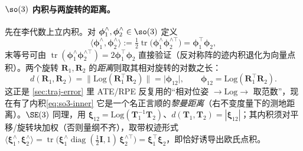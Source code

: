 \paragraph{$\so(3)$ 内积与两旋转的距离。}先在李代数上立内积。对 $\boldsymbol{\phi}_1^\wedge,\boldsymbol{\phi}_2^\wedge\in\so(3)$ 定义
\begin{equation}
  \langle\boldsymbol{\phi}_1^\wedge,\boldsymbol{\phi}_2^\wedge\rangle
  :=\tfrac12\operatorname{tr}\big(\boldsymbol{\phi}_1^\wedge\boldsymbol{\phi}_2^{\wedge\top}\big)=\boldsymbol{\phi}_1^\top\boldsymbol{\phi}_2,
  \label{eq:so3-inner}
\end{equation}
末等号可由 $\operatorname{tr}(\boldsymbol{\phi}_1^\wedge\boldsymbol{\phi}_2^{\wedge\top})=2\boldsymbol{\phi}_1^\top\boldsymbol{\phi}_2$ 直接验证（反对称阵的迹内积退化为向量点积）。两个旋转 $\mathbf{R}_1,\mathbf{R}_2$ 的\emph{距离}则取其相对旋转的对数之长：
\begin{equation}
  d(\mathbf{R}_1,\mathbf{R}_2)=\big\|\mathrm{Log}(\mathbf{R}_1^\top\mathbf{R}_2)\big\|=\big|\boldsymbol{\phi}_{12}\big|,\qquad
  \boldsymbol{\phi}_{12}=\mathrm{Log}(\mathbf{R}_1^\top\mathbf{R}_2).
  \label{eq:so3-distance}
\end{equation}
这正是 \cref{sec:traj-error} 里 ATE/RPE 反复用的“相对位姿 $\to\mathrm{Log}\to$ 取范数”，现在有了内积\cref{eq:so3-inner} 它是一个名正言顺的\emph{黎曼距离}（右不变度量下的测地距离）。$\SE(3)$ 同理，用 $\boldsymbol{\xi}_{12}=\mathrm{Log}(\mathbf{T}_1^{-1}\mathbf{T}_2)$、$d(\mathbf{T}_1,\mathbf{T}_2)=|\boldsymbol{\xi}_{12}|$；其内积须对平移/旋转块加权（否则量纲不齐），取带权迹形式 $\langle\boldsymbol{\xi}_1^\wedge,\boldsymbol{\xi}_2^\wedge\rangle=\operatorname{tr}\big(\boldsymbol{\xi}_1^\wedge\operatorname{diag}(\tfrac12\mathbf{I},1)\,\boldsymbol{\xi}_2^{\wedge\top}\big)=\boldsymbol{\xi}_1^\top\boldsymbol{\xi}_2$，即恰好诱导出欧氏点积\cite{barfoot2024state}。

